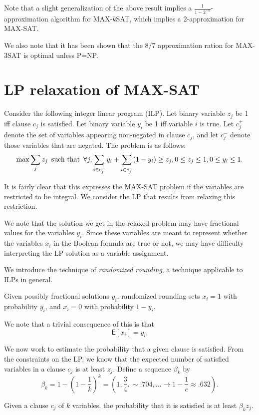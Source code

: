 \documentclass{article}
\newcommand{\E}{\mbox{$\mathsf E$}}
\begin{document}
Note that a slight generalization of the above result implies a $\frac{1}{1-2^{-k}}$-approximation algorithm for MAX-$k$SAT, which implies a 2-approximation for MAX-SAT.

We also note that it has been shown that the $8/7$ approximation ration for MAX-3SAT is optimal unless P=NP.

\section{LP relaxation of MAX-SAT}

Consider the following integer linear program (ILP).  Let binary variable $z_j$ be 1 iff clause $c_j$ is satisfied.  Let binary variable $y_i$ be 1 iff variable $i$ is true.  Let $c_j^+$ denote the set of variables appearing non-negated in clause $c_j$, and let $c_j^-$ denote those variables that are negated.  The problem is as follows:
$$\max\sum_j z_j \textrm{\enspace such that\enspace} \forall j, \sum_{i\in c_j^+}y_i+\sum_{i\in c_j^-}(1-y_i)\geq z_j, 0\leq z_j\leq 1, 0\leq y_i\leq 1.$$

It is fairly clear that this expresses the MAX-SAT problem if the variables are restricted to be integral.  We consider the LP that results from relaxing this restriction.

We note that the solution we get in the relaxed problem may have fractional values for the variables $y_i$.  Since these variables are meant to represent whether the variables $x_i$ in the Boolean formula are true or not, we may have difficulty interpreting the LP solution as a variable assignment.

We introduce the technique of \emph{randomized rounding}, a technique applicable to ILPs in general.

Given possibly fractional solutions $y_i$, randomized rounding sets $x_i=1$ with probability $y_i$, and $x_i=0$ with probability $1-y_i$.

We note that a trivial consequence of this is that $$\E[x_i]=y_i.$$

We now work to estimate the probability that a given clause is satisfied.  From the constraints on the LP, we know that the expected number of satisfied variables in a clause $c_j$ is at least $z_j$.  Define a sequence $\beta_k$ by $$\beta_k=1-(1-\frac{1}{k})^k=(1,\frac{3}{4},\sim .704,...\rightarrow 1-\frac{1}{e}\approx .632).$$

\begin{claim}
Given a clause $c_j$ of $k$ variables, the probability that it is satisfied is at least $\beta_kz_j$.
\end{claim}
\end{document}
